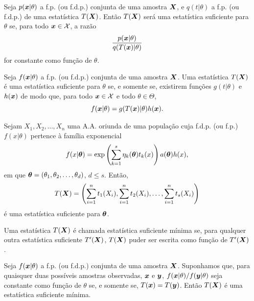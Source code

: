 \begin{theorem}
	Seja $p(\bm{x} | \theta)$ a f.p. (ou f.d.p.) conjunta de uma amostra $\bm{X}$, e $q(t | \theta)$ a f.p. (ou f.d.p.) de uma estatística $T(\bm{X})$. Então $T(\bm{X})$ será uma estatística suficiente para $\theta$ se, para todo $\bm{x} \in \mathcal{X}$, a razão
	\[
	\frac{p(\bm{x} | \theta)}{q(T(\bm{x}) | \theta)}
	\]
	for constante como função de $\theta$.
\end{theorem}

\begin{theorem}
	Seja $f(\bm{x} | \theta)$ a f.p. (ou f.d.p.) conjunta de uma amostra $\bm{X}$. Uma estatística $T(\bm{X})$ é uma estatística suficiente para $\theta$ se, e somente se, existirem funções $g(t | \theta)$ e $h(\bm{x})$ de modo que, para todo $\bm{x} \in \mathcal{X}$ e todo $\theta \in \Theta$,
	\[
	f(\bm{x} | \theta) = g(T(\bm{x}) | \theta)h(\bm{x}).
	\]
\end{theorem}

\begin{theorem}
	Sejam $X_1, X_2, \ldots, X_n$ uma A.A. oriunda de uma população cuja f.d.p. (ou f.p.) $f(x | \theta)$ pertence à família exponencial
	\[
	f(x | \bm{\theta}) = \exp\left(\sum_{k=1}^{s} \eta_k(\bm{\theta})t_k(x)\right) a(\bm{\theta})h(x),
	\]
	em que $\bm{\theta} = (\theta_1, \theta_2, \ldots, \theta_d)$, $d \leq s$. Então,
	\[
	T(\bm{X}) = \left(\sum_{i=1}^{n} t_1(X_i), \sum_{i=1}^{n} t_2(X_i), \ldots, \sum_{i=1}^{n} t_s(X_i)\right)
	\]
	é uma estatística suficiente para $\bm{\theta}$.
\end{theorem}

\begin{definition}
	Uma estatística $T(\bm{X})$ é chamada estatística suficiente mínima se, para qualquer outra estatística suficiente $T'(\bm{X})$, $T(\bm{X})$ puder ser escrita como função de $T'(\bm{X})$.
\end{definition}

\begin{theorem}
	Seja $f(\bm{x} | \theta)$ a f.p. (ou f.d.p.) conjunta de uma amostra $\bm{X}$. Suponhamos que, para quaisquer duas possíveis amostras observadas, $\bm{x}$ e $\bm{y}$, $f(\bm{x} | \theta)/f(\bm{y} | \theta)$ seja constante como função de $\theta$ se, e somente se, $T(\bm{x}) = T(\bm{y})$. Então $T(\bm{X})$ é uma estatística suficiente mínima.
\end{theorem}

